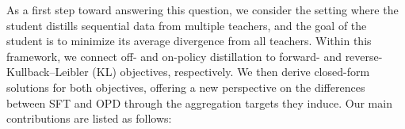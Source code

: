 \documentclass[11pt]{article}
\begin{document}
As a first step toward answering this question, we consider the setting where the student distills sequential data from multiple teachers, and the goal of the student is to minimize its average divergence from all teachers. Within this framework, we connect off- and on-policy distillation to forward- and reverse-Kullback--Leibler (KL) objectives, respectively. We then derive closed-form solutions for both objectives, offering a new perspective on the differences between SFT and OPD through the aggregation targets they induce. Our main contributions are listed as follows:
\end{document}
